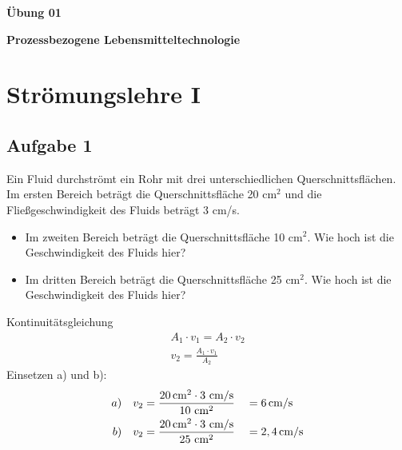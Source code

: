 \documentclass[a4paper,11pt]{article}
\begin{document}


\bckgrnd


\begin{center}
\LARGE
\color{white}
\textbf{Übung 01} \par \vspace*{2mm}
\large \color{miugray} \textbf{Prozessbezogene Lebensmitteltechnologie}
\end{center}
\par 
\vspace*{6mm}


\color{miudiutex}
\section*{Strömungslehre I}

\subsection*{Aufgabe 1}
Ein Fluid 
durchströmt ein Rohr mit drei unterschiedlichen Querschnittsflächen. 
Im ersten Bereich beträgt die Querschnittsfläche 20 cm$^2$ und die Fließgeschwindigkeit des Fluids beträgt 3 cm/s.
\begin{itemize}
\item Im zweiten Bereich beträgt die Querschnittsfläche 10 cm$^2$. Wie hoch ist die Geschwindigkeit des Fluids hier?
\item Im dritten Bereich beträgt die Querschnittsfläche 25 cm$^2$. Wie hoch ist die Geschwindigkeit des Fluids hier?

\end{itemize}

 

Kontinuitätsgleichung
\begin{align*}
A_1 \cdot v_1 = A_2 \cdot v_2 \\
v_2 = \frac{A_1 \cdot v_1}{A_2}
\end{align*}
Einsetzen a) und b):
\begin{align*}
a) &&v_2 &= \frac{20\cm^2 \cdot 3\mskip3mu \cm/\text{s}}{10\mskip3mu \cm^2} &&= 6\cm/\text{s} \\
b) &&v_2 &= \frac{20\cm^2 \cdot 3\mskip3mu \cm/\text{s}}{25\mskip3mu \cm^2} &&=2,4\cm/\text{s}
\end{align*}
\end{document}
